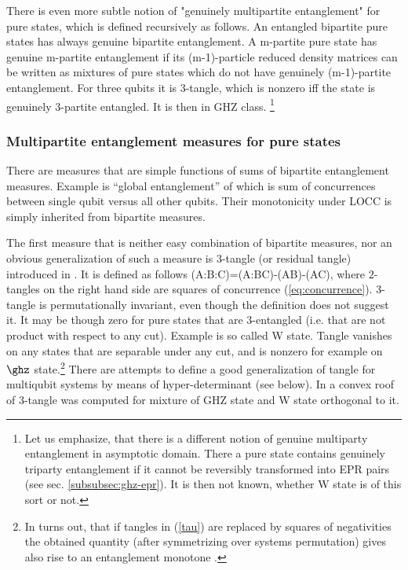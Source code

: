 \documentclass[twocolumn,aps,rmp]{revtex4}
\begin{document}
There is even more subtle notion of "genuinely multipartite entanglement"
for pure states, which is defined recursively as follows.
An entangled bipartite pure states has always genuine
bipartite entanglement.
A m-partite pure state has genuine m-partite entanglement
if its (m-1)-particle reduced density matrices can be written as mixtures
of pure states which do not have genuinely
(m-1)-partite entanglement. For three qubits it is 3-tangle,
which is nonzero iff the state is genuinely 3-partite entangled.
It is then in GHZ class.  \footnote{Let us emphasize,
that there is a different notion of genuine multiparty entanglement
in asymptotic domain. There a pure state contains genuinely triparty entanglement
if it cannot be reversibly transformed into EPR pairs (see sec. \ref{subsubsec:ghz-epr}).
It is then not known, whether W state is of this sort or not.}


\subsubsection{Multipartite entanglement measures for pure states}
\label{subsubsec:multi-pure}

There are measures that are simple functions of sums of bipartite entanglement measures.
Example is ``global entanglement'' of  \cite{MeyerW2001-global} which is
sum of concurrences  between single qubit versus all other qubits.
Their monotonicity under LOCC is simply inherited from bipartite measures.

The first measure that is neither easy combination of bipartite measures,
nor an obvious generalization of such a measure is 3-tangle (or residual tangle)
introduced in \cite{CoffmanKW-tangle}.
It is defined as follows
\be
\tau(A:B:C)=\tau(A:BC)-\tau(AB)-\tau(AC),
\label{tau}
\ee
where $2$-tangles  on the right hand side
are squares of concurrence (\ref{eq:concurrence}). 3-tangle is permutationally invariant,
even though the definition does not suggest it.
It may be though zero  for pure states that are $3$-entangled (i.e. that
are not product with respect to any cut). Example is  so called W state. Tangle vanishes
on any states that are separable under any cut, and is nonzero for example on
$\ghz$ state.\footnote {In turns out, that if tangles in (\ref{tau}) are replaced by squares of negativities
the obtained quantity (after symmetrizing over systems permutation) gives also rise to an entanglement monotone \cite {OuF2007}.}
There are attempts to define a good generalization
of tangle for multiqubit systems  by means  of hyper-determinant \cite{Miyake2002-hyper}
(see below).  In \cite{LohmayerOSU2006-tangle} a convex roof of 3-tangle was computed for
mixture of GHZ state and W state orthogonal to it.
\end{document}
